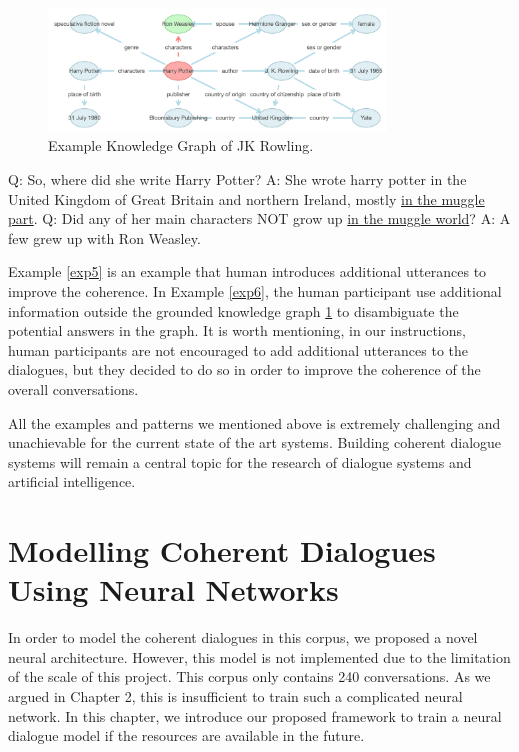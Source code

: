 \documentclass[bsc,frontabs,twoside,singlespacing,parskip,deptreport]{infthesis}     %
\begin{document}
\begin{figure}[h]
    \centering
    \includegraphics[width=0.8\textwidth]{jk.png}
    \caption{Example Knowledge Graph of JK Rowling.}
    \label{fig:jk}
\end{figure}


\begin{exe}
	\ex
	\label{exp6}
		\begin{xlist}
			\ex \label{exp3q1} Q: So, where did she write Harry Potter?
			\ex \label{exp3a1} A: She wrote harry potter in the United Kingdom of Great Britain and northern Ireland, mostly \underline{in the muggle part}.
			\ex \label{exp3q1} Q: Did any of her main characters NOT grow up \underline{in the muggle world}?
			\ex \label{exp3a1} A: A few grew up with Ron Weasley.
	\end{xlist}
\end{exe}


Example \ref{exp5} is an example that human introduces additional utterances to improve the coherence. In Example \ref{exp6}, the human participant use additional information outside the grounded knowledge graph \ref{fig:jk} to disambiguate the potential answers in the graph. It is worth mentioning, in our instructions, human participants are not encouraged to add additional utterances to the dialogues, but they decided to do so in order to improve the coherence of the overall conversations.

All the examples and patterns we mentioned above is extremely challenging and unachievable for the current state of the art systems. Building coherent dialogue systems will remain a central topic for the research of dialogue systems and artificial intelligence.



\chapter{Modelling Coherent Dialogues Using Neural Networks}

In order to model the coherent dialogues in this corpus, we proposed a novel neural architecture. However, this model is not implemented due to the limitation of the scale of this project. This corpus only contains 240 conversations. As we argued in Chapter 2, this is insufficient to train such a complicated neural network. In this chapter, we introduce our proposed framework to train a neural dialogue model if the resources are available in the future.
\end{document}

